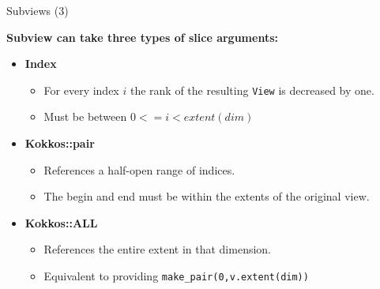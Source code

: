 
\begin{frame}[fragile]{Subviews (3)}

\textbf{Subview can take three types of slice arguments:}

\begin{itemize}
\item \textbf{Index}
\begin{itemize}
  \item For every index $i$ the rank of the resulting \texttt{View} is decreased by one.
  \item Must be between $0<=i<extent(dim)$
\end{itemize}
\item \textbf{Kokkos::pair}
\begin{itemize}
  \item References a half-open range of indices.
  \item The begin and end must be within the extents of the original view. 
\end{itemize}
\item \textbf{Kokkos::ALL}
\begin{itemize}
  \item References the entire extent in that dimension.
  \item Equivalent to providing \texttt{make\_pair(0,v.extent(dim))}
\end{itemize}
\end{itemize}

\end{frame}

